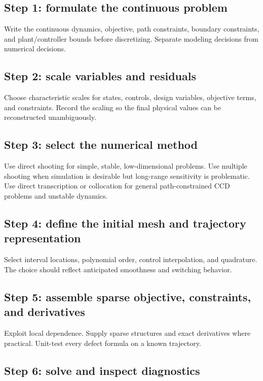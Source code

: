 \documentclass[11pt]{article}
\begin{document}
\subsection{Step 1: formulate the continuous problem}

Write the continuous dynamics, objective, path constraints, boundary constraints, and plant/controller bounds before discretizing. Separate modeling decisions from numerical decisions.

\subsection{Step 2: scale variables and residuals}

Choose characteristic scales for states, controls, design variables, objective terms, and constraints. Record the scaling so the final physical values can be reconstructed unambiguously.

\subsection{Step 3: select the numerical method}

Use direct shooting for simple, stable, low-dimensional problems. Use multiple shooting when simulation is desirable but long-range sensitivity is problematic. Use direct transcription or collocation for general path-constrained CCD problems and unstable dynamics.

\subsection{Step 4: define the initial mesh and trajectory representation}

Select interval locations, polynomial order, control interpolation, and quadrature. The choice should reflect anticipated smoothness and switching behavior.

\subsection{Step 5: assemble sparse objective, constraints, and derivatives}

Exploit local dependence. Supply sparse structures and exact derivatives where practical. Unit-test every defect formula on a known trajectory.

\subsection{Step 6: solve and inspect diagnostics}
\end{document}
